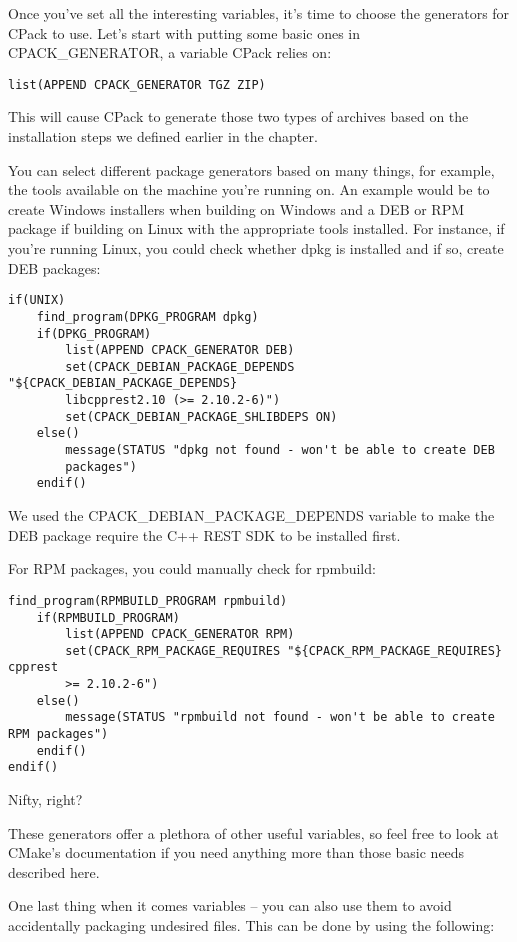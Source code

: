 Once you've set all the interesting variables, it's time to choose the generators for CPack to use. Let's start with putting some basic ones in CPACK\_GENERATOR, a variable CPack relies on:

\begin{lstlisting}[style=styleCMake]
list(APPEND CPACK_GENERATOR TGZ ZIP)
\end{lstlisting}

This will cause CPack to generate those two types of archives based on the installation steps we defined earlier in the chapter.

You can select different package generators based on many things, for example, the tools available on the machine you're running on. An example would be to create Windows installers when building on Windows and a DEB or RPM package if building on Linux with the appropriate tools installed. For instance, if you're running Linux, you could check whether dpkg is installed and if so, create DEB packages:

\begin{lstlisting}[style=styleCMake]
if(UNIX)
	find_program(DPKG_PROGRAM dpkg)
	if(DPKG_PROGRAM)
		list(APPEND CPACK_GENERATOR DEB)
		set(CPACK_DEBIAN_PACKAGE_DEPENDS "${CPACK_DEBIAN_PACKAGE_DEPENDS}
		libcpprest2.10 (>= 2.10.2-6)")
		set(CPACK_DEBIAN_PACKAGE_SHLIBDEPS ON)
	else()
		message(STATUS "dpkg not found - won't be able to create DEB
		packages")
	endif()
\end{lstlisting}

We used the CPACK\_DEBIAN\_PACKAGE\_DEPENDS variable to make the DEB package require the C++ REST SDK to be installed first.

For RPM packages, you could manually check for rpmbuild:

\begin{lstlisting}[style=styleCMake]
	find_program(RPMBUILD_PROGRAM rpmbuild)
	if(RPMBUILD_PROGRAM)
		list(APPEND CPACK_GENERATOR RPM)
		set(CPACK_RPM_PACKAGE_REQUIRES "${CPACK_RPM_PACKAGE_REQUIRES} cpprest
		>= 2.10.2-6")
	else()
		message(STATUS "rpmbuild not found - won't be able to create RPM packages")
	endif()
endif()
\end{lstlisting}

Nifty, right?

These generators offer a plethora of other useful variables, so feel free to look at CMake's documentation if you need anything more than those basic needs described here.

One last thing when it comes variables – you can also use them to avoid accidentally packaging undesired files. This can be done by using the following:


